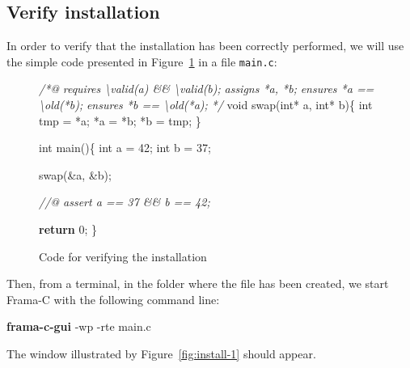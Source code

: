 \documentclass[12pt,francais,]{scrbook}
\newenvironment{Shaded}{}{}
\newcommand{\KeywordTok}[1]{\textcolor[rgb]{0.00,0.44,0.13}{\textbf{{#1}}}}
\newcommand{\DataTypeTok}[1]{\textcolor[rgb]{0.56,0.13,0.00}{{#1}}}
\newcommand{\DecValTok}[1]{\textcolor[rgb]{0.25,0.63,0.44}{{#1}}}
\newcommand{\CommentTok}[1]{\textcolor[rgb]{0.38,0.63,0.69}{\textit{{#1}}}}
\newcommand{\NormalTok}[1]{{#1}}
\begin{document}
\subsection{Verify installation}\label{verify-installation}

In order to verify that the installation has been correctly performed,
we will use the simple code presented in Figure~\ref{fig:2-2-3-simple}
in a file \texttt{main.c}:

\begin{figure}
  \centering
\begin{footnotesize}\begin{Shaded}
\begin{Highlighting}[]
\CommentTok{/*@}
\CommentTok{  requires \textbackslash{}valid(a) && \textbackslash{}valid(b);}
\CommentTok{  assigns *a, *b;}
\CommentTok{  ensures *a == \textbackslash{}old(*b);}
\CommentTok{  ensures *b == \textbackslash{}old(*a);}
\CommentTok{*/}
\DataTypeTok{void} \NormalTok{swap(}\DataTypeTok{int}\NormalTok{* a, }\DataTypeTok{int}\NormalTok{* b)\{}
  \DataTypeTok{int} \NormalTok{tmp = *a;}
  \NormalTok{*a = *b;}
  \NormalTok{*b = tmp;}
\NormalTok{\}}

\DataTypeTok{int} \NormalTok{main()\{}
  \DataTypeTok{int} \NormalTok{a = }\DecValTok{42}\NormalTok{;}
  \DataTypeTok{int} \NormalTok{b = }\DecValTok{37}\NormalTok{;}

  \NormalTok{swap(&a, &b);}

  \CommentTok{//@ assert a == 37 && b == 42;}

  \KeywordTok{return} \DecValTok{0}\NormalTok{;}
\NormalTok{\}}
\end{Highlighting}
\end{Shaded}\end{footnotesize}
\caption{Code for verifying the installation}
\label{fig:2-2-3-simple}
\end{figure}

Then, from a terminal, in the folder where the file has been created, we
start Frama-C with the following command line:

\begin{footnotesize}\begin{Shaded}
\begin{Highlighting}[]
\KeywordTok{frama-c-gui} \NormalTok{-wp -rte main.c}
\end{Highlighting}
\end{Shaded}\end{footnotesize}

The window illustrated by Figure~\ref{fig:install-1} should appear.
\end{document}
